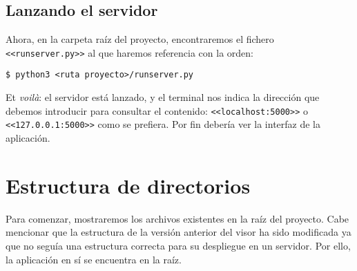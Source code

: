 \subsection{Lanzando el servidor}
Ahora, en la carpeta raíz del proyecto, encontraremos el fichero \texttt{<<runserver.py>>} al que haremos referencia con la orden:

\noindent\verb|$ python3 <ruta proyecto>/runserver.py|

Et \textit{voilà}: el servidor está lanzado, y el terminal nos indica la dirección que debemos introducir para consultar el contenido: \texttt{<<localhost:5000>>} o \texttt{<<127.0.0.1:5000>>} como se prefiera. Por fin debería ver la interfaz de la aplicación.

\section{Estructura de directorios}
\noindent Para comenzar, mostraremos los archivos existentes en la raíz del proyecto. Cabe mencionar que la estructura de la versión anterior del visor ha sido modificada ya que no seguía una estructura correcta para su despliegue en un servidor. Por ello, la aplicación en sí se encuentra en la raíz.

